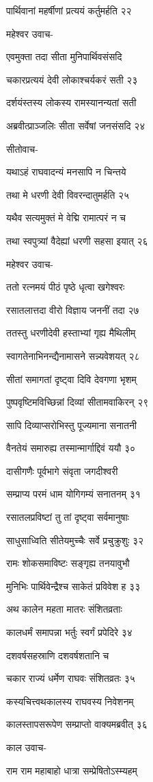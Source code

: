 पार्थिवानां महर्षीणां प्रत्ययं कर्तुमर्हति २२

महेश्वर उवाच-

एवमुक्ता तदा सीता मुनिपार्थिवसंसदि

चकारप्रत्ययं देवी लोकाश्चर्यकरं सती २३

दर्शयंस्तस्य लोकस्य रामस्यानन्यतां सती

अब्रवीत्प्राञ्जलिः सीता सर्वेषां जनसंसदि २४

सीतोवाच-

यथाऽहं राघवादन्यं मनसापि न चिन्तये

तथा मे धरणी देवी विवरन्दातुमर्हति २५

यथैव सत्यमुक्तं मे वेद्मि रामात्परं न च

तथा स्वपुत्र्यां वैदेह्यां धरणी सहसा इयात् २६

महेश्वर उवाच-

ततो रत्नमयं पीठं पृष्ठे धृत्वा खगेश्वरः

रसातलात्तदा वीरो विज्ञाय जननीं तदा २७

ततस्तु धरणीदेवी हस्ताभ्यां गृह्य मैथिलीम्

स्वागतेनाभिनन्द्यैनामासने सन्न्यवेशयत् २८

सीतां समागतां दृष्ट्वा दिवि देवगणा भृशम्

पुष्पवृष्टिमविच्छिन्नां दिव्यां सीतामवाकिरन् २९

सापि दिव्याप्सरोभिस्तु पूज्यमाना सनातनी

वैनतेयं समारुह्य तस्मान्मार्गाद्दिवं ययौ ३०

दासीगणैः पूर्वभागे संवृता जगदीश्वरी

सम्प्राप्य परमं धाम योगिगम्यं सनातनम् ३१

रसातलप्रविष्टां तु तां दृष्ट्वा सर्वमानुषाः

साधुसाध्विति सीतेयमुच्चैः सर्वे प्रचुक्रुशुः ३२

रामः शोकसमाविष्टः सङ्गृह्य तनयावुभौ

मुनिभिः पार्थिवेन्द्रैश्च साकेतं प्रविवेश ह ३३

अथ कालेन महता मातरः संशितव्रताः

कालधर्मं समापन्ना भर्तुः स्वर्गं प्रपेदिरे ३४

दशवर्षसहस्राणि दशवर्षशतानि च

चकार राज्यं धर्मेण राघवः संशितव्रतः ३५

कस्यचित्त्वथकालस्य राघवस्य निवेशनम्

कालस्तापसरूपेण सम्प्राप्तो वाक्यमब्रवीत् ३६

काल उवाच-

राम राम महाबाहो धात्रा सम्प्रेषितोऽस्म्यहम्

